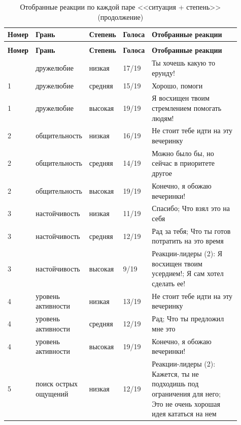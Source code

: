 	\begin{landscape}
	\begingroup
	\small
	\begin{longtable}{|p{0.06\linewidth}|p{0.2\linewidth}|p{0.11\linewidth}|p{0.08\linewidth}|p{0.46\linewidth}|}
		\caption{Отобранные реакции по каждой паре <<ситуация + степень>>}
		\label{tbl:selection_results_by_pair} \\
		\hline
		\textbf{Номер} & \textbf{Грань} & \textbf{Степень} & \textbf{Голоса} & \textbf{Отобранные реакции} \\
		\hline
		\endfirsthead
		\caption[]{Отобранные реакции по каждой паре <<ситуация + степень>> (продолжение)} \\
		\hline
		\textbf{Номер} & \textbf{Грань} & \textbf{Степень} & \textbf{Голоса} & \textbf{Отобранные реакции} \\
		\hline
		\endhead
		\hline
		\endfoot
		\endlastfoot
		1 & дружелюбие & низкая & 17/19 & Ты хочешь какую то ерунду! \\
		\hline
		1 & дружелюбие & средняя & 15/19 & Хорошо, помоги \\
		\hline
		1 & дружелюбие & высокая & 19/19 & Я восхищен твоим стремлением помогать людям! \\
		\hline
		2 & общительность & низкая & 16/19 & Не стоит тебе идти на эту вечеринку \\
		\hline
		2 & общительность & средняя & 14/19 & Можно было бы, но сейчас в приоритете другое \\
		\hline
		2 & общительность & высокая & 19/19 & Конечно, я обожаю вечеринки! \\
		\hline
		3 & настойчивость & низкая & 11/19 & Спасибо; Что взял это на себя \\
		\hline
		3 & настойчивость & средняя & 12/19 & Рад за тебя; Что ты готов потратить на это время \\
		\hline
		3 & настойчивость & высокая & 9/19 & Реакции-лидеры (2): Я восхищен твоим усердием!; Я сам хотел сделать ее! \\
		\hline
		4 & уровень активности & низкая & 13/19 & Не стоит тебе идти на эту вечеринку \\
		\hline
		4 & уровень активности & средняя & 12/19 & Рад; Что ты предложил мне это \\
		\hline
		4 & уровень активности & высокая & 19/19 & Конечно, я обожаю вечеринки! \\
		\hline
		5 & поиск острых ощущений & низкая & 12/19 & Реакции-лидеры (2): Кажется, ты не подходишь под ограничения для него; Это не очень хорошая идея кататься на нем \\

\end{longtable}
\end{landscape}

